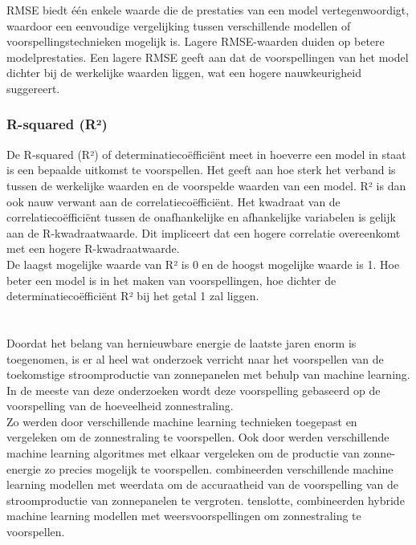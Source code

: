 RMSE biedt één enkele waarde die de prestaties van een model vertegenwoordigt, waardoor een eenvoudige vergelijking tussen verschillende modellen of voorspellingstechnieken mogelijk is. Lagere RMSE-waarden duiden op betere modelprestaties. Een lagere RMSE geeft aan dat de voorspellingen van het model dichter bij de werkelijke waarden liggen, wat een hogere nauwkeurigheid suggereert.

\subsubsection{R-squared (R²)}

De R-squared (R²) of determinatiecoëfficiënt meet in hoeverre een model in staat is een bepaalde uitkomst te voorspellen. Het geeft aan hoe sterk het verband is tussen de werkelijke waarden en de voorspelde waarden van een model. R² is dan ook nauw verwant aan de correlatiecoëfficiënt. Het kwadraat van de correlatiecoëfficiënt tussen de onafhankelijke en afhankelijke variabelen is gelijk aan de R-kwadraatwaarde. Dit impliceert dat een hogere correlatie overeenkomt met een hogere R-kwadraatwaarde. \\

De laagst mogelijke waarde van R² is 0 en de hoogst mogelijke waarde is 1. Hoe beter een model is in het maken van voorspellingen, hoe dichter de determinatiecoëfficiënt R² bij het getal 1 zal liggen.

\section{}%
\label{sec:elektriciteitsproductie voorspellen}

Doordat het belang van hernieuwbare energie de laatste jaren enorm is toegenomen, is er al heel wat onderzoek verricht naar het voorspellen van de toekomstige stroomproductie van zonnepanelen met behulp van machine learning. In de meeste van deze onderzoeken wordt deze voorspelling gebaseerd op de voorspelling van de hoeveelheid zonnestraling. \\

Zo werden door \textcite{Sehrawat2023} verschillende machine learning technieken toegepast en vergeleken om de zonnestraling te voorspellen. Ook door \textcite{Ledmaoui2023} werden verschillende machine learning algoritmes met elkaar vergeleken om de productie van zonne-energie zo precies mogelijk te voorspellen. \textcite{Wang2022} combineerden verschillende machine learning modellen met weerdata om de accuraatheid van de voorspelling van de stroomproductie van zonnepanelen te vergroten. \textcite{Sansine2023} tenslotte, combineerden hybride machine learning modellen met weersvoorspellingen om zonnestraling te voorspellen.\\

